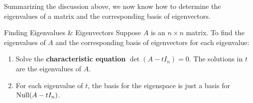 \documentclass[colorful]{notes}
\begin{document}
    Summarizing the discussion above, we now know how to determine the eigenvalues of a matrix and the corresponding basis of eigenvectors. 
    \begin{cfact}{Finding Eigenvalues \& Eigenvectors}{}
        Suppose $A$ is an $n\times n$ matrix. To find the eigenvalues of $A$ and the corresponding basis of eigenvectors for each eigenvalue: 
        \begin{enumerate}
            \item Solve the \textbf{characteristic equation} $\det(A - tI_n) = 0$. The solutions in $t$ are the eigenvalues of $A$. 
            \item For each eigenvalue of $t$, the basis for the eigenspace is just a basis for $\operatorname{Null}(A - tI_n)$.
        \end{enumerate}
    \end{cfact}
\end{document}
